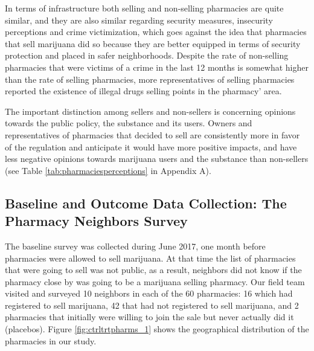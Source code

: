 \documentclass[11pt]{article}
\begin{document}
In terms of infrastructure both selling and non-selling pharmacies are quite similar, and they are also similar regarding security measures, insecurity perceptions and crime victimization, which goes against the idea that pharmacies that sell marijuana did so because they are better equipped in terms of security protection and placed in safer neighborhoods. Despite the rate of non-selling pharmacies that were victims of a crime in the last 12 months is somewhat higher than the rate of selling pharmacies, more representatives of selling pharmacies reported the existence of illegal drugs selling points in the pharmacy' area. 

The important distinction among sellers and non-sellers is concerning opinions towards the public policy, the substance and its users. Owners and representatives of pharmacies that decided to sell are consistently more in favor of the regulation and anticipate it would have more positive impacts, and have less negative opinions towards marijuana users and the substance than non-sellers (see Table \ref{tab:pharmaciesperceptions} in Appendix A). 

\subsection{Baseline and Outcome Data Collection: The Pharmacy Neighbors Survey}

The baseline survey was collected during June 2017, one month before pharmacies were allowed to sell marijuana. At that time the list of pharmacies that were going to sell was not public, as a result, neighbors did not know if the pharmacy close by was going to be a marijuana selling pharmacy. Our field team visited and surveyed 10 neighbors in each of the 60 pharmacies: 16 which had registered to sell marijuana, 42 that had not registered to sell marijuana, and 2 pharmacies that initially were willing to join the sale but never actually did it (placebos). Figure \ref{fig:ctrltrtpharms_1} shows the geographical distribution of the pharmacies in our study.
\end{document}
